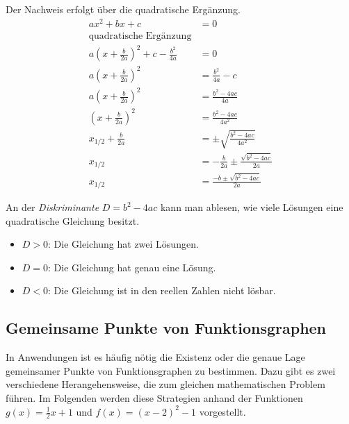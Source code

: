 \begin{bew}
 Der Nachweis erfolgt über die quadratische Ergänzung.
 \begin{align*}
  ax^2+bx+c &= 0 \\
  \text{quadratische Ergänzung} & \\
 a\left(x+\frac{b}{2a}\right)^2 + c - \frac{b^2}{4a} &= 0 \\
  a\left(x+\frac{b}{2a}\right)^2 &= \frac{b^2}{4a} -c \\
  a\left(x+\frac{b}{2a}\right)^2 &= \frac{b^2-4ac}{4a} \\
  \left(x+\frac{b}{2a}\right)^2 &= \frac{b^2-4ac}{4a^2} \\
  x_{1/2} + \frac{b}{2a} &= \pm \sqrt{\frac{b^2-4ac}{4a^2}} \\
  x_{1/2} &= -\frac{b}{2a} \pm \frac{\sqrt{b^2-4ac}}{2a} \\
  x_{1/2} &= \frac{-b\pm \sqrt{b^2-4ac}}{2a} 
 \end{align*}

\end{bew}

\begin{regel}[Diskriminante]
 An der \emph{Diskriminante} \(D = b^2-4ac\) kann man ablesen, wie viele Lösungen eine quadratische Gleichung besitzt.
 
 \begin{itemize}
  \item \(D>0\): Die Gleichung hat zwei Lösungen.
  \item \(D=0\): Die Gleichung hat genau eine Lösung.
  \item \(D<0\): Die Gleichung ist in den reellen Zahlen nicht lösbar.
 \end{itemize}
\end{regel}

\subsection{Gemeinsame Punkte von Funktionsgraphen}

In Anwendungen ist es häufig nötig die Existenz oder die genaue Lage gemeinsamer Punkte von Funktionsgraphen zu bestimmen. Dazu gibt es zwei verschiedene Herangehensweise, die zum gleichen mathematischen Problem führen. Im Folgenden werden diese Strategien anhand der Funktionen \(g(x)=\frac{1}{2}x+1\) und \(f(x)=(x-2)^2-1\) vorgestellt.


